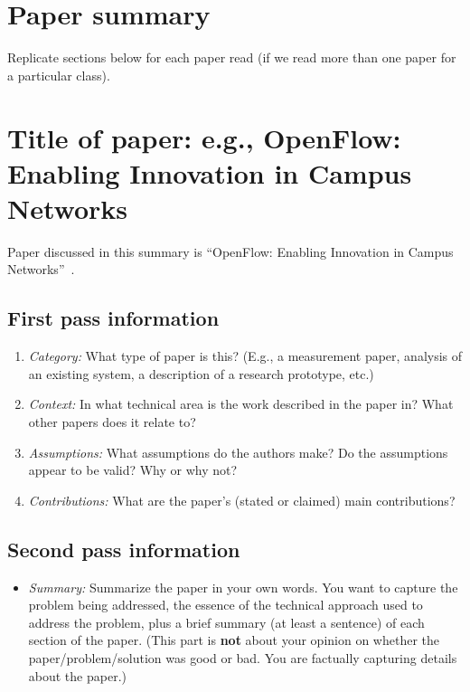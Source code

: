 \documentclass[letterpaper,twocolumn,10pt]{article}
\begin{document}
\section*{Paper summary}

Replicate sections below for each paper read (if we read more than one paper for
a particular class).

\section{Title of paper: e.g., OpenFlow: Enabling Innovation in Campus Networks}

Paper discussed in this summary is ``OpenFlow: Enabling Innovation in Campus Networks''~\cite{openflow.wp}.

\subsection{First pass information}
\label{sec:first}

\begin{enumerate}

\item {\it Category:} What type of paper is this? (E.g., a measurement paper, analysis of an existing system, a description of a research prototype, etc.)

\item {\it Context:} In what technical area is the work described in the paper in? What other papers does it relate to? 

\item {\it Assumptions:}  What assumptions do the authors make? Do the assumptions appear to be valid? Why or why not?

\item {\it Contributions:} What are the paper's (stated or claimed) main contributions?


\end{enumerate}

\subsection{Second pass information}
\label{sec:second}

\begin{itemize}

\item {\it Summary:} Summarize the paper in your own words. You want to capture
the problem being addressed, the essence of the technical approach used to address
the problem, plus a brief summary (at least a sentence) of each section of the paper.
(This part is {\bf not} about your opinion on whether the paper/problem/solution was
good or bad. You are factually capturing details about the paper.)

\end{itemize}
\end{document}
